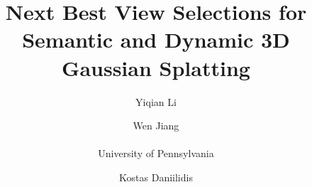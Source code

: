 \documentclass[10pt,twocolumn,letterpaper]{article}
\title{Next Best View Selections for Semantic and Dynamic 3D Gaussian Splatting}
\author{
Yiqian Li
\and Wen Jiang  \\
\\
University of Pennsylvania
\and Kostas Daniilidis
}
\begin{document}
\maketitle

    





\FloatBarrier
{
    \small
    
    
}

%  
% 
\end{document}
